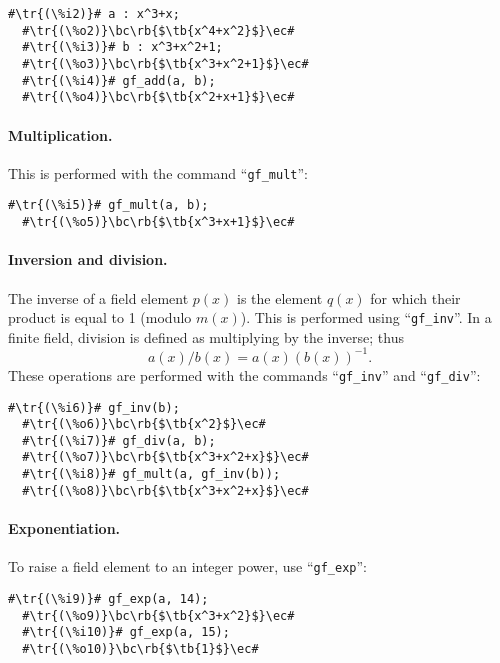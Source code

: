 \documentclass[a4paper,11pt,leqno,fleqn]{artikel3}
\newcommand{\bc}{\begin{center}}
\newcommand{\ec}{\end{center}}
\newcommand{\tr}[1]{\textcolor{red}{#1}}
\newcommand{\tb}[1]{\textcolor{blue}{#1}}
\newcommand{\rb}[1]{\raisebox{2mm}[0mm][1mm]{#1}}
\begin{document}
\vspace*{2mm}
\begin{lstlisting}[escapechar=\#]
  #\tr{(\%i2)}# a : x^3+x;
  #\tr{(\%o2)}\bc\rb{$\tb{x^4+x^2}$}\ec#
  #\tr{(\%i3)}# b : x^3+x^2+1;
  #\tr{(\%o3)}\bc\rb{$\tb{x^3+x^2+1}$}\ec#
  #\tr{(\%i4)}# gf_add(a, b);
  #\tr{(\%o4)}\bc\rb{$\tb{x^2+x+1}$}\ec#
\end{lstlisting}


\paragraph{Multiplication.}

This is performed with the command ``\verb!gf_mult!'':

\vspace*{2mm}
\begin{lstlisting}[escapechar=\#]
  #\tr{(\%i5)}# gf_mult(a, b);
  #\tr{(\%o5)}\bc\rb{$\tb{x^3+x+1}$}\ec#
\end{lstlisting}


\paragraph{Inversion and division.}

The inverse of a field element $p(x)$ is the element $q(x)$ for which their
product is equal to 1 (modulo $m(x)$).  This is performed using
``\verb!gf_inv!''.  In a finite field, division is defined as multiplying by
the inverse; thus
\[
a(x)/b(x)=a(x)(b(x))^{-1}.
\]
These operations are performed with the commands ``\verb!gf_inv!'' and
``\verb!gf_div!'':

\vspace*{2mm}
\begin{lstlisting}[escapechar=\#]
  #\tr{(\%i6)}# gf_inv(b);
  #\tr{(\%o6)}\bc\rb{$\tb{x^2}$}\ec#
  #\tr{(\%i7)}# gf_div(a, b);
  #\tr{(\%o7)}\bc\rb{$\tb{x^3+x^2+x}$}\ec#
  #\tr{(\%i8)}# gf_mult(a, gf_inv(b));
  #\tr{(\%o8)}\bc\rb{$\tb{x^3+x^2+x}$}\ec#
\end{lstlisting}


\paragraph{Exponentiation.}

To raise a field element to an integer power, use ``\verb!gf_exp!'':

\vspace*{2mm}
\begin{lstlisting}[escapechar=\#]
  #\tr{(\%i9)}# gf_exp(a, 14);
  #\tr{(\%o9)}\bc\rb{$\tb{x^3+x^2}$}\ec#
  #\tr{(\%i10)}# gf_exp(a, 15);
  #\tr{(\%o10)}\bc\rb{$\tb{1}$}\ec#
\end{lstlisting}
\end{document}
